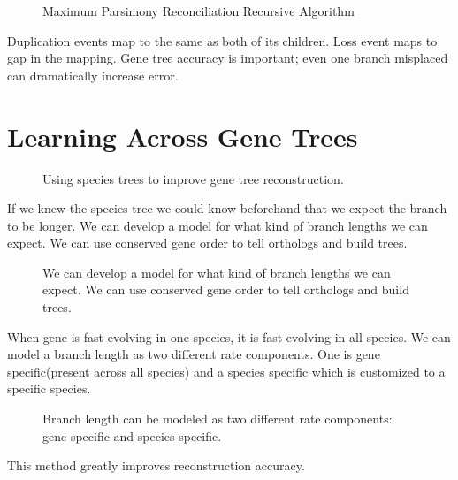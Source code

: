 \begin{figure}[ht!]
  \centering
  \caption{Maximum Parsimony Reconciliation Recursive Algorithm} 
  \label{Fig09_MPRAlgorithm}
\end{figure}

Duplication events map to the same as both of its children. Loss event
maps to gap in the mapping. Gene tree accuracy is important; even one
branch misplaced can dramatically increase error.

\section{Learning Across Gene Trees}

\begin{figure}[ht!]
  \centering
  \caption{Using species trees to improve gene tree reconstruction.} 
  \label{Fig10_LearningAcrossGeneTrees}
\end{figure}

If we knew the species tree we could know beforehand that we expect
the branch to be longer. We can develop a model for what kind of
branch lengths we can expect. We can use conserved gene order to tell
orthologs and build trees.

\begin{figure}[ht!]
  \centering
  \caption{We can develop a model for what kind of branch lengths we
    can expect. We can use conserved gene order to tell orthologs and
    build trees.}
  \label{Fig11_DevelopingRatesModel}
\end{figure}

When gene is fast evolving in one species, it is fast evolving in all
species. We can model a branch length as two different rate
components. One is gene specific(present across all species) and a
species specific which is customized to a specific species.

\begin{figure} [ht!] 
  \centering
  \caption{Branch length can be modeled as two different rate
    components: gene specific and species specific.}
  \label{Fig12_UsingRateModels}
\end{figure} 

\noindent This method greatly improves reconstruction accuracy.


